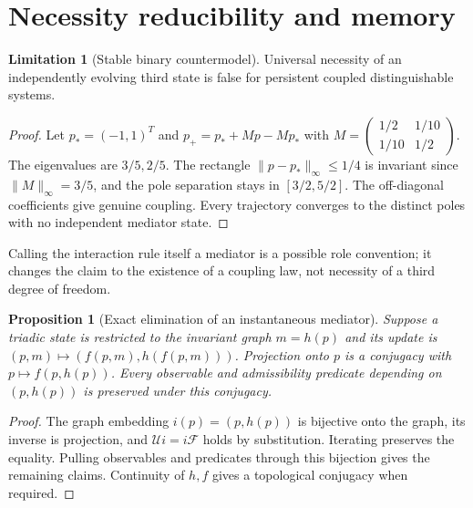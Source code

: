 \documentclass[11pt,letterpaper]{article}
\newtheorem{proposition}[theorem]{Proposition}
\theoremstyle{definition}
\newtheorem{limitation}[theorem]{Limitation}
\numberwithin{equation}{section}
\begin{document}
\section{Necessity reducibility and memory}
\begin{limitation}[Stable binary countermodel]\label{binary}
Universal necessity of an independently evolving third state is false for persistent coupled distinguishable systems.
\end{limitation}
\begin{proof}
Let $p_*=(-1,1)^T$ and $p_+=p_*+Mp-Mp_*$ with $M=\left(\begin{smallmatrix}1/2&1/10\\1/10&1/2\end{smallmatrix}\right)$. The eigenvalues are $3/5,2/5$. The rectangle $\|p-p_*\|_\infty\leq1/4$ is invariant since $\|M\|_\infty=3/5$, and the pole separation stays in $[3/2,5/2]$. The off-diagonal coefficients give genuine coupling. Every trajectory converges to the distinct poles with no independent mediator state.
\end{proof}
Calling the interaction rule itself a mediator is a possible role convention; it changes the claim to the existence of a coupling law, not necessity of a third degree of freedom.

\begin{proposition}[Exact elimination of an instantaneous mediator]\label{eliminate}
Suppose a triadic state is restricted to the invariant graph $m=h(p)$ and its update is $(p,m)\mapsto(f(p,m),h(f(p,m)))$. Projection onto $p$ is a conjugacy with $p\mapsto f(p,h(p))$. Every observable and admissibility predicate depending on $(p,h(p))$ is preserved under this conjugacy.
\end{proposition}
\begin{proof}
The graph embedding $i(p)=(p,h(p))$ is bijective onto the graph, its inverse is projection, and $\mathcal U i=i\mathcal F$ holds by substitution. Iterating preserves the equality. Pulling observables and predicates through this bijection gives the remaining claims. Continuity of $h,f$ gives a topological conjugacy when required.
\end{proof}
\end{document}
